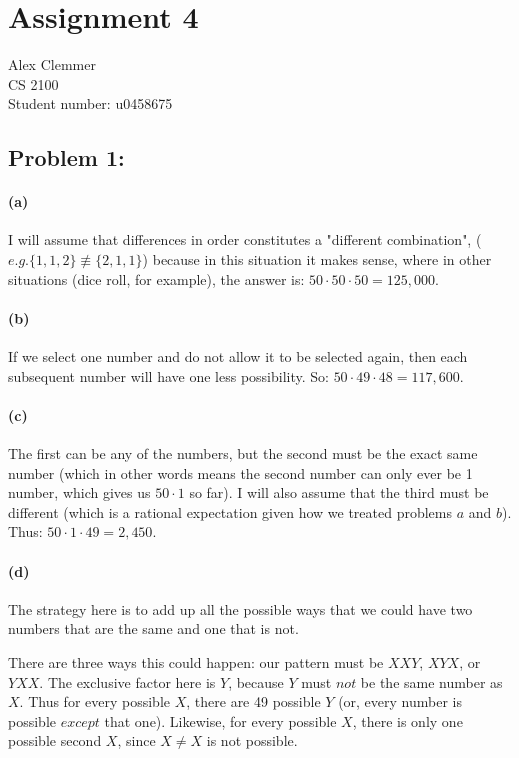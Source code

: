 \documentclass[a4paper]{article}
\begin{document}
\section*{Assignment 4}
Alex Clemmer\\
CS 2100 \\
Student number: u0458675

\subsection*{Problem 1:} 

\paragraph{(a)} I will assume that differences in order constitutes a "different combination", ($\textit{e.g.} \{1,1,2\} \not\equiv \{2,1,1\}$) because in this situation it makes sense, where in other situations (dice roll, for example), the answer is: $50 \cdot 50 \cdot 50 = 125,000$.

\paragraph{(b)} If we select one number and do not allow it to be selected again, then each subsequent number will have one less possibility. So: $50 \cdot 49 \cdot 48 = 117,600$.

\paragraph{(c)} The first can be any of the numbers, but the second must be the exact same number (which in other words means the second number can only ever be 1 number, which gives us $50 \cdot 1$ so far). I will also assume that the third must be different (which is a rational expectation given how we treated problems $\textit{a}$ and $\textit{b}$). Thus: $50 \cdot 1 \cdot 49 = 2,450$.

\paragraph{(d)} The strategy here is to add up all the possible ways that we could have two numbers that are the same and one that is not.

There are three ways this could happen: our pattern must be $XXY$, $XYX$, or $YXX$. The exclusive factor here is $Y$, because $Y$ must $\textit{not}$ be the same number as $X$. Thus for every possible $X$, there are 49 possible $Y$ (or, every number is possible $\textit{except}$ that one). Likewise, for every possible $X$, there is only one possible second $X$, since $X \ne X$ is not possible.
\end{document}
